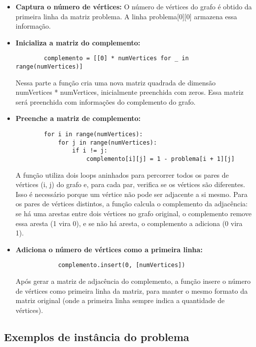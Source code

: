 \documentclass[12pt]{article}
\begin{document}
    \begin{itemize}
        \item \textbf{Captura o número de vértices:} O número de vértices do grafo é obtido da primeira linha da matriz problema. A linha problema[0][0] armazena essa informação.
        
        \item \textbf{Inicializa a matriz do complemento:} 
        \begin{verbatim}
        complemento = [[0] * numVertices for _ in range(numVertices)]
        \end{verbatim}
        Nessa parte a função cria uma nova matriz quadrada de dimensão numVertices * numVertices, inicialmente preenchida com zeros. Essa matriz será preenchida com informações do complemento do grafo.
        
        \item \textbf{Preenche a matriz de complemento:} 
        \begin{verbatim}
        for i in range(numVertices):
            for j in range(numVertices):
                if i != j:
                    complemento[i][j] = 1 - problema[i + 1][j]
        \end{verbatim}
        A função utiliza dois loops aninhados para percorrer todos os pares de vértices (i, j) do grafo e, para cada par, verifica se os vértices são diferentes. Isso é necessário porque um vértice não pode ser adjacente a si mesmo. Para os pares de vértices distintos, a função calcula o complemento da adjacência: se há uma arestas entre dois vértices no grafo original, o complemento remove essa aresta (1 vira 0), e se não há aresta, o complemento a adiciona (0 vira 1).

        \item \textbf{Adiciona o número de vértices como a primeira linha:} 
        \begin{verbatim}
            complemento.insert(0, [numVertices])
        \end{verbatim}
        Após gerar a matriz de adjacência do complemento, a função insere o número de vértices como primeira linha da matriz, para manter o mesmo formato da matriz original (onde a primeira linha sempre indica a quantidade de vértices).
    \end{itemize}
\subsection{Exemplos de instância do problema}
\end{document}
